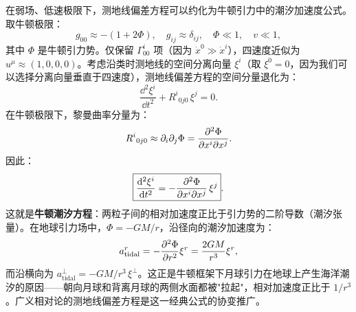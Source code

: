 \begin{note}[牛顿极限下的测地线偏差方程]
在弱场、低速极限下，测地线偏差方程可以约化为牛顿引力中的潮汐加速度公式。取牛顿极限：
\begin{equation}
    g_{00} \approx -(1 + 2\Phi), \quad g_{ij} \approx \delta_{ij}, \quad \Phi \ll 1, \quad v \ll 1,
\end{equation}
其中 $\Phi$ 是牛顿引力势。仅保留 $\Gamma^i_{00}$ 项（因为 $\dot x^0 \gg \dot x^i$），四速度近似为 $u^\mu \approx (1, 0, 0, 0)$。考虑沿类时测地线的空间分离向量 $\xi^i$（取 $\xi^0 = 0$，因为我们可以选择分离向量垂直于四速度），测地线偏差方程的空间分量退化为：
\begin{equation}
    \frac{\dd^2 \xi^i}{\dd t^2} + R^i{}_{0j0} \, \xi^j = 0.
\end{equation}
在牛顿极限下，黎曼曲率分量为：
\begin{equation}
    R^i{}_{0j0} \approx \partial_i \partial_j \Phi = \frac{\partial^2 \Phi}{\partial x^i \partial x^j}.
\end{equation}
因此：
\begin{equation}
    \boxed{\frac{\dd^2 \xi^i}{\dd t^2} = -\frac{\partial^2 \Phi}{\partial x^i \partial x^j} \, \xi^j}.
\end{equation}
这就是\textbf{牛顿潮汐方程}：两粒子间的相对加速度正比于引力势的二阶导数（潮汐张量）。在地球引力场中，$\Phi = -GM/r$，沿径向的潮汐加速度为：
\begin{equation}
    a_{\text{tidal}}^r = -\frac{\partial^2 \Phi}{\partial r^2} \xi^r = \frac{2GM}{r^3} \xi^r,
\end{equation}
而沿横向为 $a_{\text{tidal}}^\perp = -GM/r^3 \, \xi^\perp$。这正是牛顿框架下月球引力在地球上产生海洋潮汐的原因——朝向月球和背离月球的两侧水面都被"拉起"，相对加速度正比于 $1/r^3$。广义相对论的测地线偏差方程是这一经典公式的协变推广。
\end{note}

